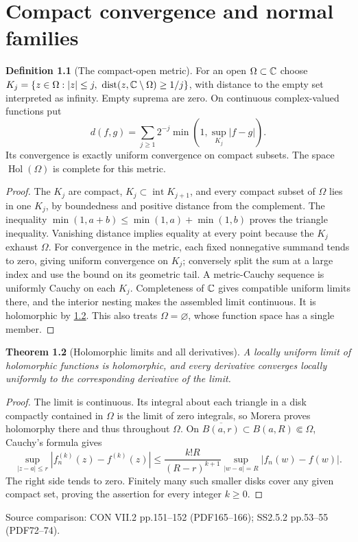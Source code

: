 \documentclass[11pt,a4paper,openany]{book}
\newtheorem{theorem}{Theorem}[chapter]
\theoremstyle{definition}
\newtheorem{definition}[theorem]{Definition}
\theoremstyle{remark}\newtheorem{remark}[theorem]{Remark}
\DeclareMathOperator{\Hol}{Hol}\DeclareMathOperator{\Mer}{Mer}
\DeclareMathOperator{\dist}{dist}\DeclareMathOperator{\ord}{ord}
\newcommand{\family}[1]{}
\newcommand{\source}[1]{\par\begingroup\small\sffamily\color{black!65}Source comparison: #1\par\endgroup}
\begin{document}

\chapter{Compact convergence and normal families}\label{ch:d12-11}

\begin{definition}[The compact-open metric]\family{D12.11.01}\label{d12:11-01}
For an open $\Omega\subset\mathbb C$ choose
$K_j=\{z\in\Omega:|z|\le j,\ \dist(z,\C\setminus\Omega)\ge1/j\}$, with distance to the empty set interpreted as infinity. Empty suprema are zero. On continuous complex-valued functions put
\[
 d(f,g)=\sum_{j\ge1}2^{-j}\min(1,\sup_{K_j}|f-g|).
\]
Its convergence is exactly uniform convergence on compact subsets. The space $\Hol(\Omega)$ is complete for this metric.
\end{definition}
\begin{proof}
The $K_j$ are compact, $K_j\subset\operatorname{int}K_{j+1}$, and every compact subset of $\Omega$ lies in one $K_j$, by boundedness and positive distance from the complement. The inequality $\min(1,a+b)\le\min(1,a)+\min(1,b)$ proves the triangle inequality. Vanishing distance implies equality at every point because the $K_j$ exhaust $\Omega$. For convergence in the metric, each fixed nonnegative summand tends to zero, giving uniform convergence on $K_j$; conversely split the sum at a large index and use the bound on its geometric tail. A metric-Cauchy sequence is uniformly Cauchy on each $K_j$. Completeness of $\mathbb C$ gives compatible uniform limits there, and the interior nesting makes the assembled limit continuous. It is holomorphic by \cref{d12:11-02}. This also treats $\Omega=\varnothing$, whose function space has a single member.
\end{proof}

\begin{theorem}[Holomorphic limits and all derivatives]\family{D12.11.02}\label{d12:11-02}
A locally uniform limit of holomorphic functions is holomorphic, and every derivative converges locally uniformly to the corresponding derivative of the limit.
\end{theorem}
\begin{proof}
The limit is continuous. Its integral about each triangle in a disk compactly contained in $\Omega$ is the limit of zero integrals, so Morera proves holomorphy there and thus throughout $\Omega$. On $\overline{B(a,r)}\subset B(a,R)\Subset\Omega$, Cauchy's formula gives
\[
 \sup_{|z-a|\le r}|f_n^{(k)}(z)-f^{(k)}(z)|
 \le \frac{k!R}{(R-r)^{k+1}}\sup_{|w-a|=R}|f_n(w)-f(w)|.
\]
The right side tends to zero. Finitely many such smaller disks cover any given compact set, proving the assertion for every integer $k\ge0$.
\end{proof}
\source{CON VII.2 pp.151--152 (PDF165--166); SS2.5.2 pp.53--55 (PDF72--74).}
\end{document}
